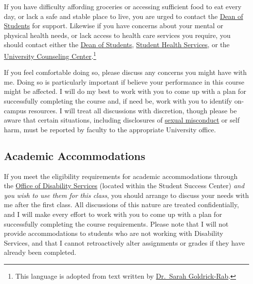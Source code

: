 \documentclass[
]{book}
\begin{document}
If you have difficulty affording groceries or accessing sufficient food to eat every day, or lack a safe and stable place to live, you are urged to contact the \href{https://www.slu.edu/student-development/dean-of-students/index.php}{Dean of Students} for support. Likewise if you have concerns about your mental or physical health needs, or lack access to health care services you require, you should contact either the \href{https://www.slu.edu/student-development/dean-of-students/index.php}{Dean of Students}, \href{https://www.slu.edu/life-at-slu/student-health/index.php}{Student Health Services}, or the \href{https://www.slu.edu/life-at-slu/university-counseling/index.php}{University Counseling Center}.\footnote{This language is adopted from text written by \href{https://medium.com/@saragoldrickrab/basic-needs-security-and-the-syllabus-d24cc7afe8c9}{Dr.~Sarah Goldrick-Rab}.}

If you feel comfortable doing so, please discuss any concerns you might have with me. Doing so is particularly important if believe your performance in this course might be affected. I will do my best to work with you to come up with a plan for successfully completing the course and, if need be, work with you to identify on-campus resources. I will treat all discussions with discretion, though please be aware that certain situations, including disclosures of \href{/compassionate-coursework.html}{sexual misconduct} or self harm, must be reported by faculty to the appropriate University office.

\hypertarget{academic-accommodations}{%
\subsection{Academic Accommodations}\label{academic-accommodations}}

If you meet the eligibility requirements for academic accommodations through the \href{https://www.slu.edu/life-at-slu/student-success-center/disability-services/index.php}{Office of Disability Services} (located within the Student Success Center) \emph{and you wish to use them for this class}, you should arrange to discuss your needs with me after the first class. All discussions of this nature are treated confidentially, and I will make every effort to work with you to come up with a plan for successfully completing the course requirements. Please note that I will not provide accommodations to students who are not working with Disability Services, and that I cannot retroactively alter assignments or grades if they have already been completed.
\end{document}
